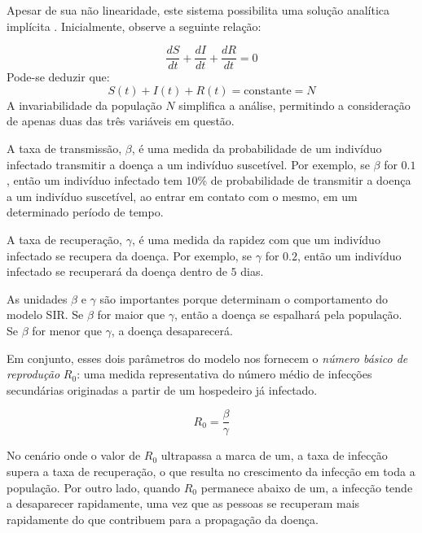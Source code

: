 Apesar de sua não linearidade, este sistema possibilita uma solução analítica implícita \cite{Harko2014}. Inicialmente, observe a seguinte relação:

{\large
\begin{equation}\label{eq:conservacao_populacao}
\frac{dS}{dt} + \frac{dI}{dt} + \frac{dR}{dt} = 0
\end{equation}}
Pode-se deduzir que:
{\large
\begin{equation}\label{eq:conservacao_populacao2}
S(t) + I(t) + R(t) = \text{constante} = N
\end{equation}}
A invariabilidade da população $N$ simplifica a análise, permitindo a consideração de apenas duas das três variáveis em questão.

A taxa de transmissão, $\beta$, é uma medida da probabilidade de um indivíduo infectado transmitir a doença a um indivíduo suscetível. Por exemplo, se $\beta$ for $0.1$, então um indivíduo infectado tem $10$\% de probabilidade de transmitir a doença a um indivíduo suscetível, ao entrar em contato com o mesmo, em um determinado período de tempo.

A taxa de recuperação, $\gamma$, é uma medida da rapidez com que um indivíduo infectado se recupera da doença. Por exemplo, se $\gamma$ for $0.2$, então um indivíduo infectado se recuperará da doença dentro de $5$ dias.

As unidades $\beta$ e $\gamma$ são importantes porque determinam o comportamento do modelo SIR. Se $\beta$ for maior que $\gamma$, então a doença se espalhará pela população. Se $\beta$ for menor que $\gamma$, a doença desaparecerá.

Em conjunto, esses dois parâmetros do modelo nos fornecem o \textit{número básico de  reprodução} $R_{0}$: uma medida representativa do número médio de infecções secundárias originadas a partir de um hospedeiro já infectado.

{\large
\begin{equation}
R_0 = \frac{\beta}{\gamma}
\label{eq:R0}
\end{equation}}

No cenário onde o valor de $R_{0}$ ultrapassa a marca de um, a taxa de infecção supera a taxa de recuperação, o que resulta no crescimento da infecção em toda a população. Por outro lado, quando $R_{0}$ permanece abaixo de um, a infecção tende a desaparecer rapidamente, uma vez que as pessoas se recuperam mais rapidamente do que contribuem para a propagação da doença.